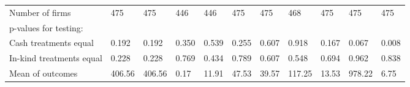 \documentclass{report}
\begin{document}
\begin{table}[H]
{\begin{tabular}{lllllllllll}
\hspace{1em}Number of firms & 475 & 475 & 446 & 446 & 475 & 475 & 468 & 475 & 475 & 475\\
\hspace{1em}p-values for testing: &  &  &  &  &  &  &  &  &  & \\
\hspace{1em}\hspace{1em} Cash treatments equal & 0.192 & 0.192 & 0.350 & 0.539 & 0.255 & 0.607 & 0.918 & 0.167 & 0.067 & 0.008\\
\hspace{1em}\hspace{1em} In-kind treatments equal & 0.228 & 0.228 & 0.769 & 0.434 & 0.789 & 0.607 & 0.548 & 0.694 & 0.962 & 0.838\\
\hspace{1em}Mean of outcomes & 406.56 & 406.56 & 0.17 & 11.91 & 47.53 & 39.57 & 117.25 & 13.53 & 978.22 & 6.75\\
\bottomrule
\end{tabular}}
\end{table}
\end{document}
